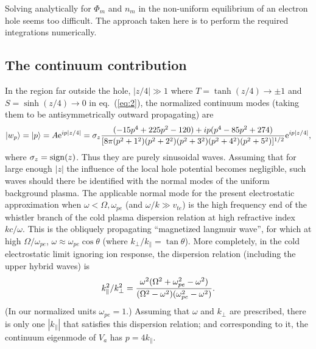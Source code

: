 \documentclass[12pt]{article}
\def\ket#1{|#1\rangle}
\def\etothe#1{{\rm e}^{#1}}
\begin{document}
Solving analytically for $\Phi_m$ and $n_m$ in the non-uniform
equilibrium of an electron hole seems too difficult. The approach
taken here is to perform the required integrations numerically.



\subsection{The continuum contribution}

In the region far outside the hole, $|z/4|\gg 1$ where
$T=\tanh(z/4)\to\pm1$ and $S=\sinh(z/4)\to0$ in eq.\ (\ref{eq:2}), the
normalized continuum modes (taking them to be antisymmetrically
outward propagating) are
\begin{equation}
  \label{eq:14}
 \ket{w_p}= \ket{p}=A\etothe{ip|z/4|}=\sigma_z{(-15p^4+225p^2-120) +ip (p^{4}-85p^{2}+274)\over
      [8\pi(p^2+1^2)(p^2+2^2)(p^2+3^2)(p^2+4^2)(p^2+5^2)]^{1/2}}\etothe{ip|z/4|},
\end{equation}
where $\sigma_z={\rm sign}(z)$. Thus they are purely sinusoidal
waves. Assuming that for large enough $|z|$ the influence of the local
hole potential becomes negligible, such waves should there be
identified with the normal modes of the uniform background plasma.
The applicable normal mode for the present electrostatic approximation
when $\omega<\Omega,\omega_{pe}$ (and $\omega/k\gg v_{te}$) is the high
frequency end of the whistler branch of the cold plasma dispersion
relation at high refractive index $kc/\omega$. This is the obliquely
propagating ``magnetized langmuir wave'', for which at high
$\Omega/\omega_{pe}$, 
$\omega\approx\omega_{pe}\cos\theta$ (where
$k_\perp/k_\parallel=\tan\theta$). More completely, in the cold
electrostatic limit ignoring ion response, the dispersion relation
(including the upper hybrid waves) is
\begin{equation}
  \label{eq:15}
  k_\parallel^2/k_\perp^2={\omega^2(\Omega^2+\omega_{pe}^2-\omega^2)
    \over(\Omega^2-\omega^2)(\omega_{pe}^2-\omega^2)}.
\end{equation}
(In our normalized units $\omega_{pe}=1$.)  Assuming that $\omega$ and
$k_\perp$ are prescribed, there is only one $|k_\parallel|$ that
satisfies this dispersion relation; and corresponding to it, the
continuum eigenmode of $V_a$ has $p=4k_\parallel$.
\end{document}
